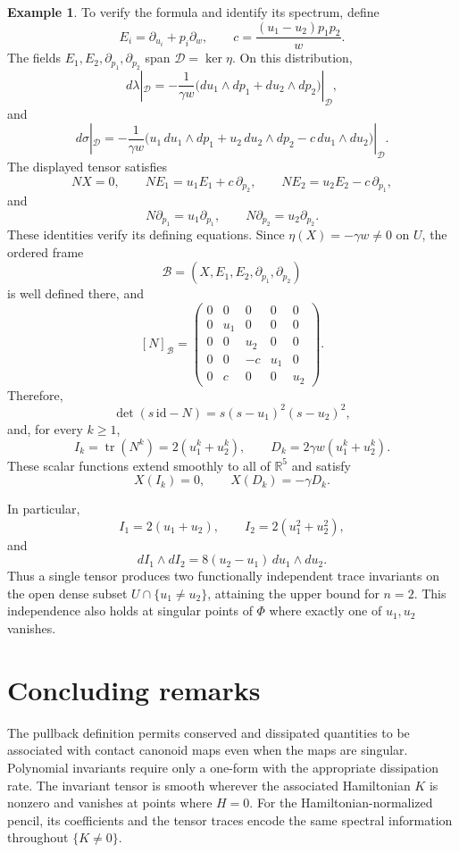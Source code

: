 \documentclass[11pt,a4paper]{article}
\numberwithin{equation}{section}
\theoremstyle{definition}
\newtheorem{example}{Example}
\theoremstyle{remark}
\begin{document}
\begin{example}
To verify the formula and identify its spectrum, define
\[
E_i=\partial_{u_i}+p_i\partial_w,
\qquad
c=\frac{(u_1-u_2)p_1p_2}{w}.
\]
The fields $E_1,E_2,\partial_{p_1},\partial_{p_2}$ span
$\mathcal D=\ker\eta$. On this distribution,
\[
d\lambda|_{\mathcal D}
=-\frac{1}{\gamma w}
 \bigl(du_1\wedge dp_1+du_2\wedge dp_2\bigr)|_{\mathcal D},
\]
and
\[
d\sigma|_{\mathcal D}
=-\frac{1}{\gamma w}
 \bigl(
 u_1\,du_1\wedge dp_1
 +u_2\,du_2\wedge dp_2
 -c\,du_1\wedge du_2
 \bigr)|_{\mathcal D}.
\]
The displayed tensor satisfies
\[
NX=0,\qquad
NE_1=u_1E_1+c\,\partial_{p_2},
\qquad
NE_2=u_2E_2-c\,\partial_{p_1},
\]
and
\[
N\partial_{p_1}=u_1\partial_{p_1},
\qquad
N\partial_{p_2}=u_2\partial_{p_2}.
\]
These identities verify its defining equations. Since
$\eta(X)=-\gamma w\neq0$ on $U$, the ordered frame
\[
\mathcal B=(X,E_1,E_2,\partial_{p_1},\partial_{p_2})
\]
is well defined there, and
\[
[N]_{\mathcal B}
=
\begin{pmatrix}
0&0&0&0&0\\
0&u_1&0&0&0\\
0&0&u_2&0&0\\
0&0&-c&u_1&0\\
0&c&0&0&u_2
\end{pmatrix}.
\]
Therefore,
\[
\det(s\,\mathrm{id}-N)
=s(s-u_1)^2(s-u_2)^2,
\]
and, for every $k\geq1$,
\[
I_k=\operatorname{tr}(N^k)
=2(u_1^k+u_2^k),
\qquad
D_k=2\gamma w(u_1^k+u_2^k).
\]
These scalar functions extend smoothly to all of
$\mathbb R^5$ and satisfy
\[
X(I_k)=0,\qquad X(D_k)=-\gamma D_k.
\]

In particular,
\[
I_1=2(u_1+u_2),
\qquad
I_2=2(u_1^2+u_2^2),
\]
and
\[
dI_1\wedge dI_2
=8(u_2-u_1)\,du_1\wedge du_2.
\]
Thus a single tensor produces two functionally independent
trace invariants on the open dense subset
$U\cap\{u_1\neq u_2\}$, attaining the upper bound for $n=2$.
This independence also holds at singular points of $\Phi$
where exactly one of $u_1,u_2$ vanishes.
\end{example}





\section{Concluding remarks}

The pullback definition permits conserved and dissipated
quantities to be associated with contact canonoid maps
even when the maps are singular. Polynomial invariants
require only a one-form with the appropriate dissipation
rate. The invariant tensor is smooth wherever the
associated Hamiltonian $K$ is nonzero and vanishes at
points where $H=0$. For the Hamiltonian-normalized pencil,
its coefficients and the tensor traces encode the same
spectral information throughout $\{K\neq0\}$.
\end{document}
